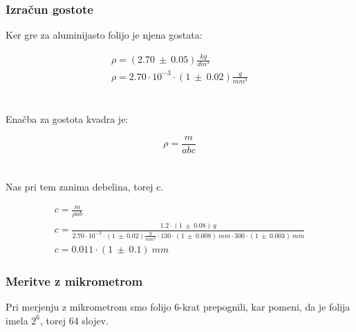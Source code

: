 \documentclass{report}
\begin{document}
\subsubsection{Izračun gostote}

Ker gre za aluminijasto folijo je njena gostata:

\begin{equation}
  \begin{gathered}
  \rho = (2.70 \ \pm \ 0.05) \frac{kg}{dm^3} \\
  \rho = 2.70 \cdot 10^{-3} \cdot (1 \ \pm \ 0.02) \frac{g}{mm^3}
  \end{gathered}
\end{equation}\\\\
Enačba za gostota kvadra je:

\begin{equation}
  \rho = \frac{m}{abc}
\end{equation} \\\\
Nas pri tem zanima debelina, torej c.

\begin{equation}
  \begin{gathered}
    c = \frac{m}{\rho ab} \\
    c = \frac{1.2 \cdot (1 \ \pm \ 0.08) \ g}{2.70 \cdot 10^{-3} \cdot (1 \ \pm \ 0.02) \frac{g}{mm^3} \cdot 
    130 \cdot (1 \ \pm \ 0.008) \ mm \cdot 300 \cdot (1 \ \pm \ 0.003) \ mm} \\
    \boxed{c =  0.011 \cdot (1 \ \pm \ 0.1) \ mm}
  \end{gathered}
\end{equation}

\pagebreak
\subsubsection{Meritve z mikrometrom}

Pri merjenju z mikrometrom smo folijo 6-krat prepognili, kar pomeni, da je folija imela $2^{6}$, torej
64 slojev.
\end{document}
